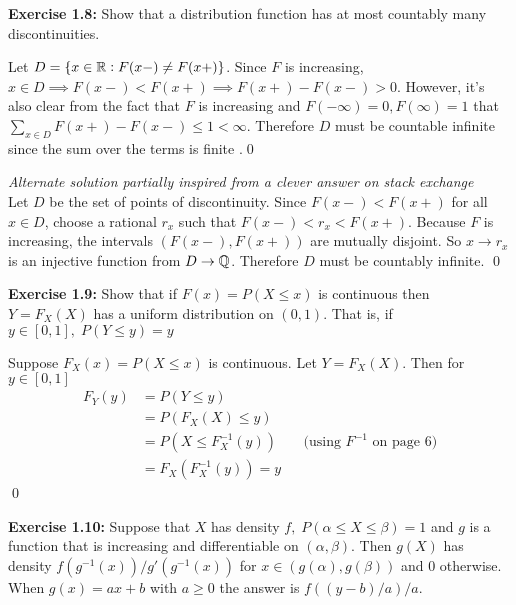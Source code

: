 \textbf{Exercise 1.8:} Show that a distribution function has at most countably many discontinuities.
\begin{mdframed}
    Let $D = \{x \in \mathbb{R}: F(x-) \neq F(x+)\}$. Since $F$ is increasing, $x \in D \implies F(x-) < F(x+) \implies F(x+) - F(x-) > 0$. However, it's also clear from the fact that $F$ is increasing and $F(-\infty) = 0, F(\infty) = 1$ that $\sum_{x \in D} F(x+)-F(x-) \leq 1 < \infty$. Therefore $D$ must be countable infinite since the sum over the terms is finite \cite[11]{folland2nd}.\qed
\end{mdframed}
\begin{mdframed}
    \textit{Alternate solution partially inspired from a clever answer on stack exchange}\\
    Let $D$ be the set of points of discontinuity. Since $F(x-) < F(x+)$ for all $x \in D$, choose a rational $r_x$ such that $F(x-) < r_x < F(x+)$. Because $F$ is increasing, the intervals $(F(x-), F(x+))$ are mutually disjoint. So $x \to r_x$ is an injective function from $D \to \mathbb{Q}$. Therefore $D$ must be countably infinite. \qed
\end{mdframed}
\textbf{Exercise 1.9:} Show that if $F(x) = P(X \leq x)$ is continuous then $Y = F_X(X)$ has a uniform distribution on $(0,1)$. That is, if $y \in [0,1], \; P(Y \leq y) = y$
\begin{mdframed}
    Suppose $F_X(x) = P(X \leq x)$ is continuous. Let $Y = F_X(X)$. Then for $y \in [0,1]$
    \begin{align*}
        F_Y(y) &= P(Y \leq y) \\
        &= P(F_X(X) \leq y) \\
        &= P(X \leq F_X^{-1}(y)) &&\text{(using $F^{-1}$ on page 6)} \\
        &= F_X(F_X^{-1}(y))  = y
    \end{align*} \qed
\end{mdframed}
\textbf{Exercise 1.10:} Suppose that $X$ has density $f, \; P(\alpha \leq X \leq \beta) = 1$ and $g$ is a function that is increasing and differentiable on $(\alpha, \beta)$. Then $g(X)$ has density $f(g^{-1}(x))/g'(g^{-1}(x))$ for $x \in (g(\alpha), g(\beta))$ and $0$ otherwise. When $g(x) = ax + b$ with $a \geq 0$ the answer is $f((y-b)/a)/a$.
